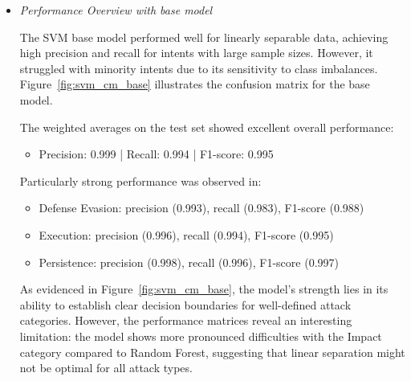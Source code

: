             \begin{itemize}
        
                \item \textit{Performance Overview with base model}
                
                    \vspace{0.3em}
                    

                    The SVM base model performed well for linearly separable data, achieving high precision and recall for intents with large sample sizes. However, it struggled with minority intents due to its sensitivity to class imbalances. Figure~\ref{fig:svm_cm_base} illustrates the confusion matrix for the base model.
                    
                    
                    The weighted averages on the test set showed excellent overall performance:
                    
                    \begin{itemize}
                        \item Precision: 0.999 | Recall: 0.994 | F1-score: 0.995
                    \end{itemize}

                    Particularly strong performance was observed in:
                    
                    \begin{itemize}
                        \item Defense Evasion: precision (0.993), recall (0.983), F1-score (0.988)
                        \item Execution: precision (0.996), recall (0.994), F1-score (0.995)
                        \item Persistence: precision (0.998), recall (0.996), F1-score (0.997)
                    \end{itemize}
                    
                    As evidenced in Figure~\ref{fig:svm_cm_base}, the model's strength lies in its ability to establish clear decision boundaries for well-defined attack categories. However, the performance matrices reveal an interesting limitation: the model shows more pronounced difficulties with the Impact category compared to Random Forest, suggesting that linear separation might not be optimal for all attack types.
                    

\end{itemize}

